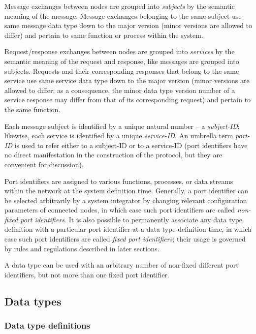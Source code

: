 Message exchanges between nodes are grouped into \emph{subjects} by the semantic meaning of the message.
Message exchanges belonging to the same subject use same message data type down to the major version
(minor versions are allowed to differ) and pertain to same function or process within the system.

Request/response exchanges between nodes are grouped into \emph{services} by the semantic meaning
of the request and response,
like messages are grouped into subjects.
Requests and their corresponding responses that belong to the same service use same service data type down to
the major version (minor versions are allowed to differ; as a consequence, the minor data type version number
of a service response may differ from that of its corresponding request) and pertain to the same function.

Each message subject is identified by a unique natural number -- a \emph{subject-ID};
likewise, each service is identified by a unique \emph{service-ID}.
An umbrella term \emph{port-ID} is used to refer either to a subject-ID or to a service-ID
(port identifiers have no direct manifestation in the construction of the protocol,
but they are convenient for discussion).

Port identifiers are assigned to various functions, processes, or data streams within the network
at the system definition time.
Generally, a port identifier can be selected arbitrarily by a system integrator
by changing relevant configuration parameters of connected nodes,
in which case such port identifiers are called \emph{non-fixed port identifiers}.
It is also possible to permanently associate any data type definition with a particular port identifier
at a data type definition time,
in which case such port identifiers are called \emph{fixed port identifiers};
their usage is governed by rules and regulations described in later sections.

A data type can be used with an arbitrary number of non-fixed different port identifiers,
but not more than one fixed port identifier.

\subsection{Data types}

\subsubsection{Data type definitions}

